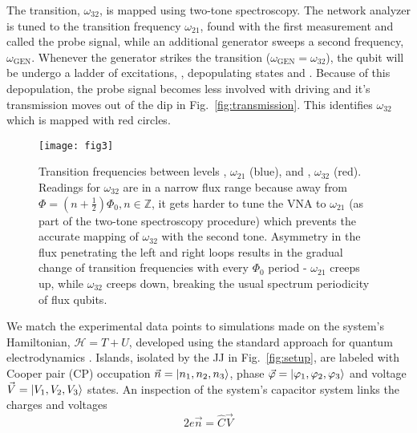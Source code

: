 The  \ilra{}   transition,  $\omega_{32}$,  is  mapped   using  two-tone
spectroscopy.   The  network  analyzer  is  tuned  to  the  transition  frequency
$ \omega_{21} $, found  with the first measurement and called  the probe signal, while
an additional generator sweeps a  second frequency, $ \omega_{\text{GEN}} $.  Whenever
the      generator      strikes     the      \ira{}      transition
($\omega_{\text{GEN}} = \omega_{32} $), the qubit  will be undergo a ladder of excitations,
      ,  depopulating
states   and .   Because of this  depopulation, the  probe signal
becomes less involved with driving and it's  transmission moves out of the dip in
Fig.~\ref{fig:transmission}.  This  identifies $\omega_{32}$ which is  mapped with red
circles.



\begin{figure}[h]
  \texttt{[image: fig3]}
  \caption{\small Transition  frequencies between levels  \ilra {},
    $ \omega_{21}  $ (blue), and   \ilra {}, $ \omega_{32}$  (red).  Readings
    for   $  \omega_{32}   $  are   in  a   narrow  flux   range  because   away  from
    $ \Phi = (n + \frac{1}{2})\Phi_0, n\in\mathbb{Z} $, it gets harder to tune the VNA to
    $ \omega_{21}  $ (as part of  the two-tone spectroscopy procedure)  which prevents
    the accurate mapping  of $ \omega_{32} $  with the second tone.   Asymmetry in the
    flux penetrating  the left and right  loops results in the  gradual change of
    transition frequencies  with every  $ \Phi_{0}  $ period  - $\omega_{21}$  creeps up,
    while $\omega_{32}$ creeps  down, breaking the usual spectrum  periodicity of flux
    qubits.}
  \label{fig:experiment}
\end{figure}

We  match the  experimental  data  points to  simulations  made  on the  system's
Hamiltonian, $ \mathcal{H} =  T + U $, developed using  the standard approach for
quantum  electrodynamics  \cite{orlando1999}.  Islands,  isolated  by  the JJ  in
Fig.~\ref{fig:setup},   are   labeled   with    Cooper   pair   (CP)   occupation
$       \vec{n}      =       \Ket{n_1,       n_2,       n_3}      $,       phase
$     \vec{\varphi}      =     \Ket{\varphi_1,      \varphi_2,     \varphi_3}     $      and     voltage
$ \vec{V} =  \Ket{V_{1}, V_{2}, V_{3}} $ states.  An  inspection of the system's
capacitor system links the charges and voltages
\begin{equation}
  \label{eq:link}
  2e\vec{n} = \hat{C}\vec{V}
\end{equation}

